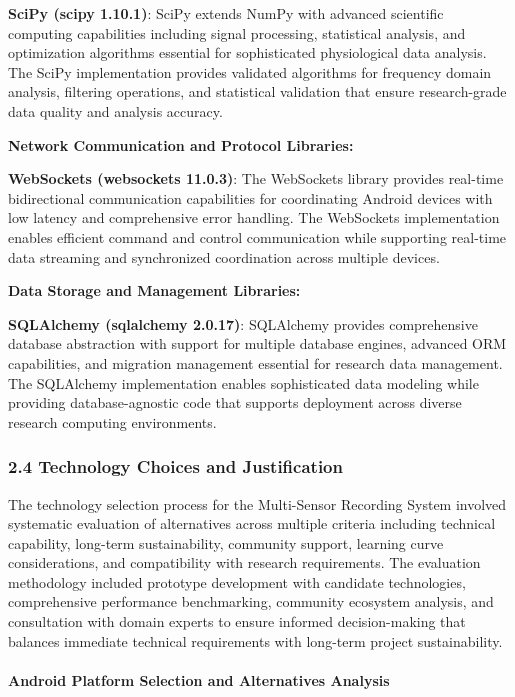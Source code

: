\documentclass[12pt,a4paper]{report}
\begin{document}
\textbf{SciPy (scipy 1.10.1)}: SciPy extends NumPy with advanced scientific computing capabilities including signal
processing, statistical analysis, and optimization algorithms essential for sophisticated physiological data analysis.
The SciPy implementation provides validated algorithms for frequency domain analysis, filtering operations, and
statistical validation that ensure research-grade data quality and analysis accuracy.

\textbf{Network Communication and Protocol Libraries:}

\textbf{WebSockets (websockets 11.0.3)}: The WebSockets library provides real-time bidirectional communication capabilities
for coordinating Android devices with low latency and comprehensive error handling. The WebSockets implementation
enables efficient command and control communication while supporting real-time data streaming and synchronized
coordination across multiple devices.

\textbf{Data Storage and Management Libraries:}

\textbf{SQLAlchemy (sqlalchemy 2.0.17)}: SQLAlchemy provides comprehensive database abstraction with support for multiple
database engines, advanced ORM capabilities, and migration management essential for research data management. The
SQLAlchemy implementation enables sophisticated data modeling while providing database-agnostic code that supports
deployment across diverse research computing environments.

\subsubsection{2.4 Technology Choices and Justification}

The technology selection process for the Multi-Sensor Recording System involved systematic evaluation of alternatives
across multiple criteria including technical capability, long-term sustainability, community support, learning curve
considerations, and compatibility with research requirements. The evaluation methodology included prototype development
with candidate technologies, comprehensive performance benchmarking, community ecosystem analysis, and consultation with
domain experts to ensure informed decision-making that balances immediate technical requirements with long-term project
sustainability.

\paragraph{Android Platform Selection and Alternatives Analysis}
\end{document}
